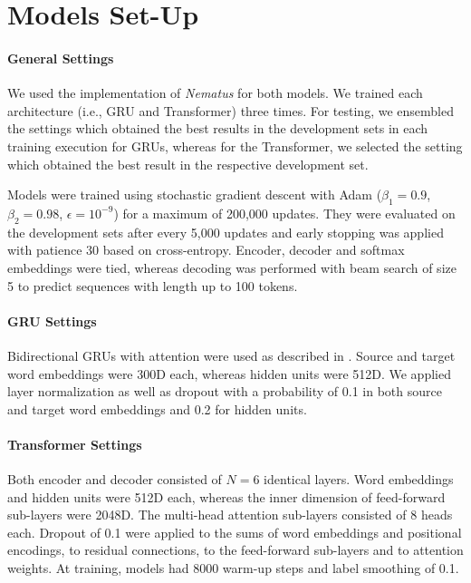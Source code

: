 \documentclass[11pt,a4paper]{article}
\begin{document}
\section{Models Set-Up}

\paragraph{General Settings} We used the implementation of \textit{Nematus} \cite{sennrich2017} for both models. We trained each architecture (i.e., GRU and Transformer) three times. For testing, we ensembled the settings which obtained the best results in the development sets in each training execution for GRUs, whereas for the Transformer, we selected the setting which obtained the best result in the respective development set.

Models were trained using stochastic gradient descent with Adam \cite{diederik2015} ($\beta_1=0.9$, $\beta_2=0.98$, $\epsilon=10^{-9}$) for a maximum of 200,000 updates. They were evaluated on the development sets after every 5,000 updates and early stopping was applied with patience 30 based on cross-entropy. Encoder, decoder and softmax embeddings were tied, whereas decoding was performed with beam search of size 5 to predict sequences with length up to 100 tokens. 

\paragraph{GRU Settings} Bidirectional GRUs with attention were used as described in \citet{sennrich2017}. Source and target word embeddings were 300D each, whereas hidden units were 512D.  We applied layer normalization as well as dropout with a probability of 0.1 in both source and target word embeddings and 0.2 for hidden units.

\paragraph{Transformer Settings} Both encoder and decoder consisted of $N = 6$ identical layers. Word embeddings and hidden units were 512D each, whereas the inner dimension of feed-forward sub-layers were 2048D. The multi-head attention sub-layers consisted of 8 heads each. Dropout of 0.1 were applied to the sums of word embeddings and positional encodings, to residual connections, to the feed-forward sub-layers and to attention weights. At training, models had $8000$ warm-up steps and label smoothing of 0.1.   
\end{document}
